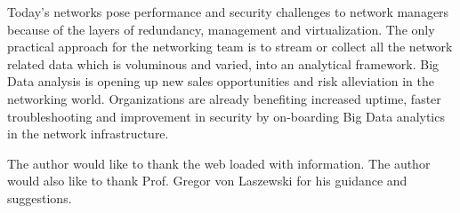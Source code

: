 \documentclass[sigconf]{acmart}
\begin{document}
Today's networks pose performance and security challenges to network managers because of the layers of redundancy, management and virtualization. The only practical approach for the networking team is to stream or collect all the network related data which is voluminous and varied, into an analytical framework. Big Data analysis is opening up new sales opportunities and risk alleviation in the networking world. Organizations are already benefiting increased uptime, faster troubleshooting and improvement in security by on-boarding Big Data analytics in the network infrastructure.

\begin{acks}

The author would like to thank the web loaded with information. The author would also like to thank Prof. Gregor von Laszewski for his guidance and suggestions.

\end{acks}


 
\end{document}
